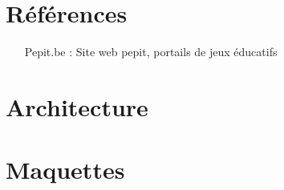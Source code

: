 \chapter{Références}
\begin{itemize}
\item[Pepit.be :] Site web pepit, portails de jeux éducatifs
\end{itemize}


%
%
%


\chapter{Architecture}
\label{annexe_architecture}



\chapter{Maquettes}
